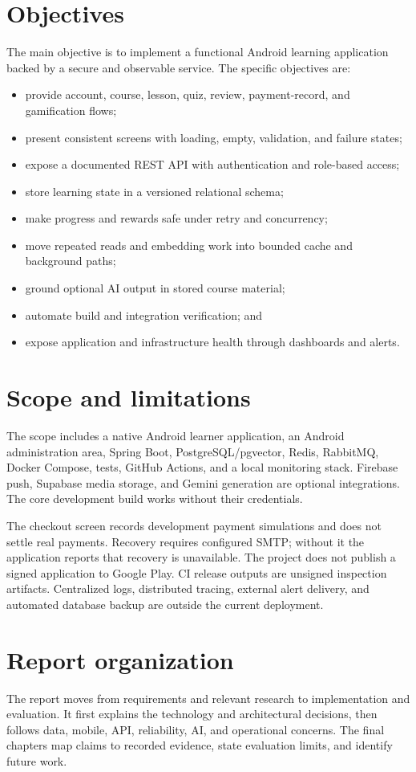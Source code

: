 \documentclass[12pt,a4paper,oneside]{report}
\begin{document}
\section{Objectives}
The main objective is to implement a functional Android learning application backed
by a secure and observable service. The specific objectives are:
\begin{itemize}[leftmargin=*]
\item provide account, course, lesson, quiz, review, payment-record, and gamification flows;
\item present consistent screens with loading, empty, validation, and failure states;
\item expose a documented REST API with authentication and role-based access;
\item store learning state in a versioned relational schema;
\item make progress and rewards safe under retry and concurrency;
\item move repeated reads and embedding work into bounded cache and background paths;
\item ground optional AI output in stored course material;
\item automate build and integration verification; and
\item expose application and infrastructure health through dashboards and alerts.
\end{itemize}

\section{Scope and limitations}
The scope includes a native Android learner application, an Android administration
area, Spring Boot, PostgreSQL/pgvector, Redis, RabbitMQ, Docker Compose, tests,
GitHub Actions, and a local monitoring stack. Firebase push, Supabase media storage,
and Gemini generation are optional integrations. The core development build works
without their credentials.

The checkout screen records development payment simulations and does not settle
real payments. Recovery requires configured SMTP; without it the application reports
that recovery is unavailable. The project does not publish a signed application to
Google Play. CI release outputs
are unsigned inspection artifacts. Centralized logs, distributed tracing, external
alert delivery, and automated database backup are outside the current deployment.

\section{Report organization}
The report moves from requirements and relevant research to implementation and
evaluation. It first explains the technology and architectural decisions, then follows
data, mobile, API, reliability, AI, and operational concerns. The final chapters map
claims to recorded evidence, state evaluation limits, and identify future work.
\end{document}
